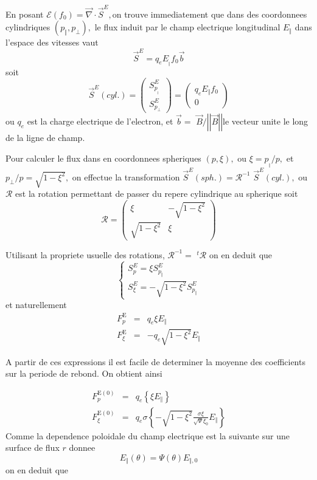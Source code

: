 En posant $\mathcal{E}(f_{0})=\overrightarrow{\nabla}\cdot\overrightarrow{S}^{E},$on
trouve immediatement que dans des coordonnees cylindriques $\left(p_{\Vert},p_{\bot}\right),$
le flux induit par le champ electrique longitudinal $E_{\Vert}$ dans
l'espace des vitesses vaut \[
\overrightarrow{S}^{E}=q_{e}E_{_{\Vert}}f_{0}\overrightarrow{b}\]
 soit \[
\overrightarrow{S}^{E}\left(cyl.\right)=\left(\begin{array}{l}
S_{p_{_{\Vert}}}^{E}\\
S_{p_{\bot}}^{E}\end{array}\right)=\left(\begin{array}{l}
q_{e}E_{\Vert}f_{0}\\
0\end{array}\right)\]
 ou $q_{e}$ est la charge electrique de l'electron, et $\overrightarrow{b}=$
$\overrightarrow{B}/\left|\left|\overrightarrow{B}\right|\right|$le
vecteur unite le long de la ligne de champ.

Pour calculer le flux dans en coordonnees spheriques $\left(p,\xi\right),$
ou $\xi=p_{_{\Vert}}/p,$ et $p_{\bot}/p=\sqrt{1-\xi^{2}},$ on effectue
la transformation $\overrightarrow{S}^{E}\left(sph.\right)=\mathcal{R}^{-1}$
$\overrightarrow{S}^{E}\left(cyl.\right),$ ou $\mathcal{R}$ est
la rotation permettant de passer du repere cylindrique au spherique
soit \[
\mathcal{R}=\left(\begin{array}{ll}
\xi & -\sqrt{1-\xi^{2}}\\
\sqrt{1-\xi^{2}} & \xi\end{array}\right)\]


Utilisant la propriete usuelle des rotations, $\mathcal{R}^{-1}=$
$^{t}\mathcal{R}$ on en deduit que \[
\left\{ \begin{array}{l}
S_{p}^{E}=\xi S_{p_{\Vert}}^{E}\\
S_{\xi}^{E}=-\sqrt{1-\xi^{2}}S_{p_{\Vert}}^{E}\end{array}\right.\]
 et naturellement \begin{eqnarray*}
F_{p}^{\text{E}} & = & q_{e}\xi E_{\Vert}\\
F_{\xi}^{\text{E}} & = & -q_{e}\sqrt{1-\xi^{2}}E_{\Vert}\end{eqnarray*}


A partir de ces expressions il est facile de determiner la moyenne
des coefficients sur la periode de rebond. On obtient ainsi

\begin{eqnarray*}
F_{p}^{\text{E}(0)} & = & q_{e}\left\{ \xi E_{\Vert}\right\} \\
F_{\xi}^{\text{E}(0)} & = & q_{e}\sigma\left\{ -\sqrt{1-\xi^{2}}\frac{\sigma\xi}{\sqrt{\Psi}\xi_{0}}E_{\Vert}\right\} \end{eqnarray*}
 Comme la dependence poloidale du champ electrique est la suivante
sur une surface de flux $r$ donnee \[
E_{\Vert}(\theta)=\Psi(\theta)E_{\Vert,0}\]
 on en deduit que

